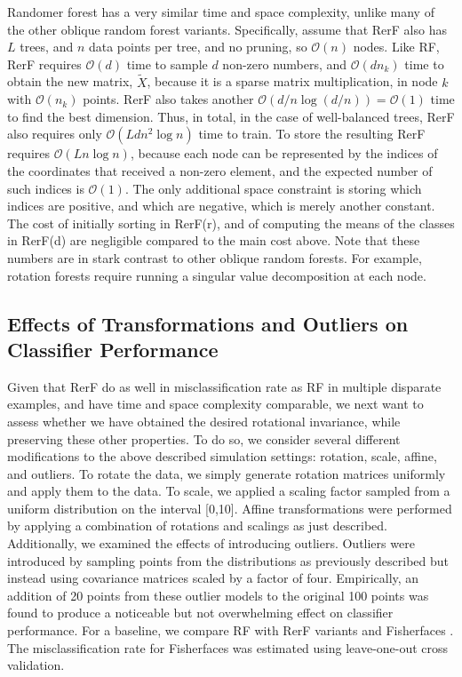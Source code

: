\documentclass{article} %
\providecommand{\mc}[1]{\mathcal{#1}}
\providecommand{\mt}[1]{\widetilde{#1}}
\begin{document}
Randomer forest has a very similar time and space complexity, unlike many of the other oblique random forest variants.  Specifically, assume that RerF also has $L$ trees, and $n$ data points per tree, and no pruning, so $\mc O(n)$ nodes. Like RF, RerF requires $\mc{O}(d)$ time to sample $d$ non-zero numbers, and $\mc{O}(dn_k)$ time to obtain the new matrix, $\mt{X}$, because it is a sparse matrix multiplication, in node $k$ with $\mc O(n_k)$ points.  RerF also takes another $\mc{O}(d/n\log(d/n))=\mc O(1)$ time to find the best dimension. Thus, in total, in the case of well-balanced trees, RerF also requires only $\mc{O}(Ldn^2\log n)$ time to train.  To store the resulting RerF  requires $\mc{O}(L n\log n )$, because each node can be represented by the indices of the coordinates that received a non-zero element, and the expected number of such indices is $\mc O(1)$.  The only additional space constraint is storing which indices are positive, and which are negative, which is merely another constant.
The cost of initially sorting in RerF(r), and of computing the means of the classes in RerF(d) are negligible compared to the main cost above. Note that these numbers are in stark contrast to other oblique random forests.  For example, rotation forests require running a singular value decomposition at each node.


\subsection{Effects of Transformations and Outliers on Classifier Performance}

Given that RerF do as well in misclassification rate as RF in multiple disparate examples, and have time and space complexity comparable, we next want to assess whether we have obtained the desired rotational invariance, while preserving these other properties.  To do so, we consider several different modifications to the above described simulation settings: rotation, scale, affine, and outliers.  To rotate the data, we simply generate rotation matrices uniformly and apply them to the data.  To scale, we applied a scaling factor sampled from a uniform distribution on the interval [0,10]. 
Affine transformations were performed by applying a combination of rotations and scalings as just described. Additionally, we examined the effects of introducing outliers. Outliers were introduced by sampling points from the distributions as previously described but instead using covariance matrices scaled by a factor of four. Empirically, an addition of 20 points from these outlier models to the original 100 points was found to produce a noticeable but not overwhelming effect on classifier performance. For a baseline, we compare RF with RerF variants and Fisherfaces \cite{Fisherfaces}. The misclassification rate for Fisherfaces was estimated using leave-one-out cross validation.
\end{document}
